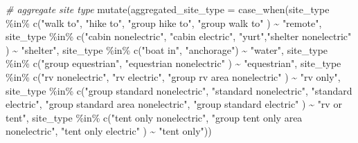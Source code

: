 \documentclass[
  11 pt,
  openany]{book}
\newenvironment{Shaded}{\begin{snugshade}}{\end{snugshade}}
\newcommand{\AttributeTok}[1]{\textcolor[rgb]{0.77,0.63,0.00}{#1}}
\newcommand{\CommentTok}[1]{\textcolor[rgb]{0.56,0.35,0.01}{\textit{#1}}}
\newcommand{\FunctionTok}[1]{\textcolor[rgb]{0.00,0.00,0.00}{#1}}
\newcommand{\NormalTok}[1]{#1}
\newcommand{\SpecialCharTok}[1]{\textcolor[rgb]{0.00,0.00,0.00}{#1}}
\newcommand{\StringTok}[1]{\textcolor[rgb]{0.31,0.60,0.02}{#1}}
\begin{document}
\begin{Shaded}
\begin{Highlighting}[]
\CommentTok{\# aggregate site type}
\FunctionTok{mutate}\NormalTok{(}\AttributeTok{aggregated\_site\_type =} 
         \FunctionTok{case\_when}\NormalTok{(site\_type }\SpecialCharTok{\%in\%} \FunctionTok{c}\NormalTok{(}\StringTok{"walk to"}\NormalTok{, }\StringTok{"hike to"}\NormalTok{, }
                                    \StringTok{"group hike to"}\NormalTok{, }\StringTok{"group walk to"}
\NormalTok{         ) }\SpecialCharTok{\textasciitilde{}} \StringTok{"remote"}\NormalTok{,}
\NormalTok{         site\_type }\SpecialCharTok{\%in\%} \FunctionTok{c}\NormalTok{(}\StringTok{"cabin nonelectric"}\NormalTok{, }\StringTok{"cabin electric"}\NormalTok{, }
                          \StringTok{"yurt"}\NormalTok{,}\StringTok{"shelter nonelectric"}
\NormalTok{         ) }\SpecialCharTok{\textasciitilde{}} \StringTok{"shelter"}\NormalTok{,}
\NormalTok{         site\_type }\SpecialCharTok{\%in\%} \FunctionTok{c}\NormalTok{(}\StringTok{"boat in"}\NormalTok{, }\StringTok{"anchorage"}\NormalTok{) }\SpecialCharTok{\textasciitilde{}} \StringTok{"water"}\NormalTok{,}
\NormalTok{         site\_type }\SpecialCharTok{\%in\%} \FunctionTok{c}\NormalTok{(}\StringTok{"group equestrian"}\NormalTok{, }
                          \StringTok{"equestrian nonelectric"}
\NormalTok{         ) }\SpecialCharTok{\textasciitilde{}} \StringTok{"equestrian"}\NormalTok{,}
\NormalTok{         site\_type }\SpecialCharTok{\%in\%} \FunctionTok{c}\NormalTok{(}\StringTok{"rv nonelectric"}\NormalTok{, }\StringTok{"rv electric"}\NormalTok{, }
                          \StringTok{"group rv area nonelectric"}
\NormalTok{         ) }\SpecialCharTok{\textasciitilde{}} \StringTok{"rv only"}\NormalTok{,}
\NormalTok{         site\_type }\SpecialCharTok{\%in\%} \FunctionTok{c}\NormalTok{(}\StringTok{"group standard nonelectric"}\NormalTok{, }
                          \StringTok{"standard nonelectric"}\NormalTok{,}
                          \StringTok{"standard electric"}\NormalTok{, }
                          \StringTok{"group standard area nonelectric"}\NormalTok{,}
                          \StringTok{"group standard electric"}
\NormalTok{         ) }\SpecialCharTok{\textasciitilde{}} \StringTok{"rv or tent"}\NormalTok{,}
\NormalTok{         site\_type }\SpecialCharTok{\%in\%} \FunctionTok{c}\NormalTok{(}\StringTok{"tent only nonelectric"}\NormalTok{, }
                          \StringTok{"group tent only area nonelectric"}\NormalTok{,}
                          \StringTok{"tent only electric"}
\NormalTok{         ) }\SpecialCharTok{\textasciitilde{}} \StringTok{"tent only"}\NormalTok{))}
\end{Highlighting}
\end{Shaded}
\end{document}
